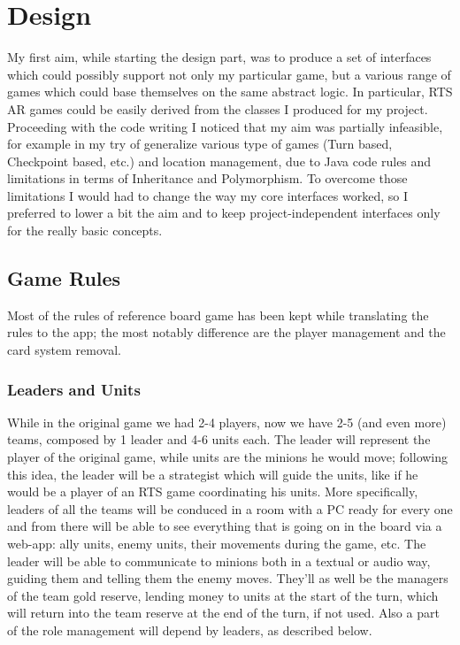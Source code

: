 \chapter{Design}

	My first aim, while starting the design part, was to produce a set of interfaces which could possibly support not only my particular game, but a various range of games which could base themselves on the same abstract logic.
	In particular, RTS AR games could be easily derived from the classes I produced for my project.
	Proceeding with the code writing I noticed that my aim was partially infeasible, for example in my try of generalize various type of games (Turn based, Checkpoint based, etc.) and location management, due to Java code rules and limitations in terms of Inheritance and Polymorphism.
	To overcome those limitations I would had to change the way my core interfaces worked, so I preferred to lower a bit the aim and to keep project-independent interfaces only for the really basic concepts.

	\section{Game Rules}
		
		Most of the rules of reference board game has been kept while translating the rules to the app; the most notably difference are the player management and the card system removal.
		
		\subsection{Leaders and Units}
		
			While in the original game we had 2-4 players, now we have 2-5 (and even more) teams, composed by 1 leader and 4-6 units each.
			The leader will represent the player of the original game, while units are the minions he would move; following this idea, the leader will be a strategist which will guide the units, like if he would be a player of an RTS game coordinating his units.
			More specifically, leaders of all the teams will be conduced in a room with a PC ready for every one and from there will be able to see everything that is going on in the board via a web-app: ally units, enemy units, their movements during the game, etc.
			The leader will be able to communicate to minions both in a textual or audio way, guiding them and telling them the enemy moves.
			They'll as well be the managers of the team gold reserve, lending money to units at the start of the turn, which will return into the team reserve at the end of the turn, if not used.
			Also a part of the role management will depend by leaders, as described below.
		
